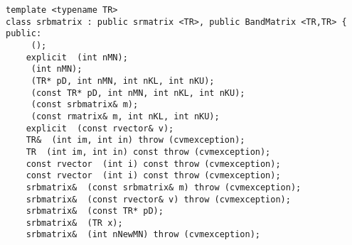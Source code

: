 \bigskip
\noindent
\verb"template <typename TR>"\\
\verb"class srbmatrix : public srmatrix <TR>, public BandMatrix <TR,TR> {"\\
\verb"public:"\\
\verb"    "\verb" ();"\\
\verb"    explicit "\verb" (int nMN);"\\
\verb"    "\verb" (int nMN);"\\
\verb"    "\verb" (TR* pD, int nMN, int nKL, int nKU);"\\
\verb"    "\verb" (const TR* pD, int nMN, int nKL, int nKU);"\\
\verb"    "\verb" (const srbmatrix& m);"\\
\verb"    "\verb" (const rmatrix& m, int nKL, int nKU);"\\
\verb"    explicit "\verb" (const rvector& v);"\\
\verb"    TR& "\verb" (int im, int in) throw (cvmexception);"\\
\verb"    TR "\verb" (int im, int in) const throw (cvmexception);"\\
\verb"    const rvector "\verb" (int i) const throw (cvmexception);"\\
\verb"    const rvector "\verb" (int i) const throw (cvmexception);"\\
\verb"    srbmatrix& "\verb" (const srbmatrix& m) throw (cvmexception);"\\
\verb"    srbmatrix& "\verb" (const rvector& v) throw (cvmexception);"\\
\verb"    srbmatrix& "\verb" (const TR* pD);"\\
\verb"    srbmatrix& "\verb" (TR x);"\\
\verb"    srbmatrix& "\verb" (int nNewMN) throw (cvmexception);"\\
